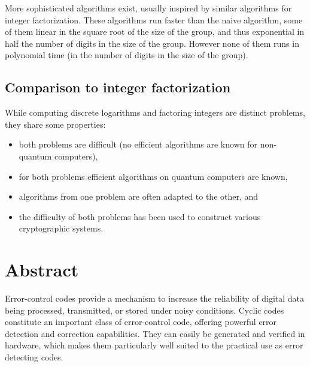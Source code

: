 \documentclass[oneside, a4paper, 11pt]{memoir}
\begin{document}
More sophisticated algorithms exist, usually inspired by similar algorithms for integer factorization. These algorithms run faster than the naive algorithm, some of them linear in the square root of the size of the group, and thus exponential in half the number of digits in the size of the group. However none of them runs in polynomial time (in the number of digits in the size of the group).


\subsection{Comparison to integer factorization}
While computing discrete logarithms and factoring integers are distinct problems, they share some properties:

\begin{itemize}
	\setlength{\itemsep}{-2pt}
	\item both problems are difficult (no efficient algorithms are known for non-quantum computers),
	\item for both problems efficient algorithms on quantum computers are known,
	\item algorithms from one problem are often adapted to the other, and
	\item the difficulty of both problems has been used to construct various cryptographic systems.
\end{itemize}

\section{Abstract}
Error-control codes provide a mechanism to increase the reliability of digital data being processed, transmitted, or stored under noisy conditions. Cyclic codes constitute an important class of error-control code, offering powerful error detection and correction capabilities. They can easily be generated and verified in hardware, which makes them particularly well suited to the practical use as error detecting codes.
\end{document}
